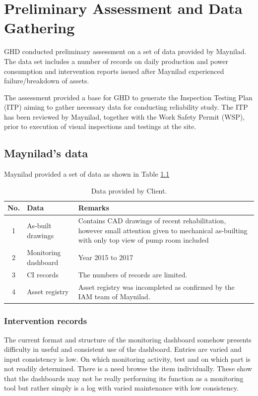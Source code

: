 \chapter{Preliminary Assessment and Data Gathering} %
\label{Chapter2}
GHD conducted preliminary assessment on a set of data provided by Maynilad. The data set includes a number of records on daily production and power consumption and intervention reports issued after Maynilad experienced failure/breakdown of assets.

The assessment provided a base for GHD to generate the Inspection Testing Plan (ITP) \cite{GHD2018a} aiming to gather necessary data for conducting reliability study. The ITP has been reviewed by Maynilad, together with the Work Safety Permit (WSP), prior to execution of visual inspections and testings at the site.

\section{Maynilad's data}
\label{21}
Maynilad provided a set of data as shown in Table \ref{mayniladdata}

\begin{table}[h]
	\caption{Data provided by Client.}
	\label{mayniladdata}
	{\footnotesize
		\begin{tabular}{l|p{5cm}|p{8cm}}
			\hline
			\multicolumn{1}{c|}{No.} & Data & Remarks \\ 
			\hline
			\multicolumn{1}{c|}{1} & As-built drawings & Contains CAD drawings of recent rehabilitation, however small attention given to mechanical as-builting with only top view of pump room included \\ 
			\multicolumn{1}{c|}{2} & Monitoring dashboard & Year 2015 to 2017 \\ 
			\multicolumn{1}{c|}{3} & CI records & The numbers of records are limited. \\ 
			\multicolumn{1}{c|}{4} & Asset registry & Asset registry was incompleted as confirmed by the IAM team of Maynilad. \\ 
			\hline
		\end{tabular}
	}
\end{table}


\subsection{Intervention records}
\label{212}
The current format and structure of the monitoring dashboard somehow presents difficulty in useful and consistent use of the dashboard. Entries are varied and input consistency is low. On which monitoring activity, test and on which part is not readily determined. There is a need browse the item individually. These show that the dashboards may not be really performing its function as a monitoring tool but rather simply is a log with varied maintenance with low consistency. 

